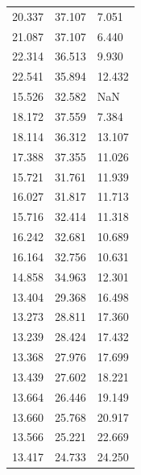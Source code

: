 \begin{table}[]
\begin{tabular}{@{}lll@{}}
		20.337    & 37.107    & 7.051        \\
		21.087    & 37.107    & 6.440        \\
		22.314    & 36.513    & 9.930        \\
		22.541    & 35.894    & 12.432       \\
		15.526    & 32.582    & NaN          \\
		18.172    & 37.559    & 7.384        \\
		18.114    & 36.312    & 13.107       \\
		17.388    & 37.355    & 11.026       \\
		15.721    & 31.761    & 11.939       \\
		16.027    & 31.817    & 11.713       \\
		15.716    & 32.414    & 11.318       \\
		16.242    & 32.681    & 10.689       \\
		16.164    & 32.756    & 10.631       \\
		14.858    & 34.963    & 12.301       \\
		13.404    & 29.368    & 16.498       \\
		13.273    & 28.811    & 17.360       \\
		13.239    & 28.424    & 17.432       \\
		13.368    & 27.976    & 17.699       \\
		13.439    & 27.602    & 18.221       \\
		13.664    & 26.446    & 19.149       \\
		13.660    & 25.768    & 20.917       \\
		13.566    & 25.221    & 22.669       \\
		13.417    & 24.733    & 24.250       \\ \bottomrule
	\end{tabular}
\end{table}

